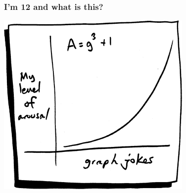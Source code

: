 \documentclass{beamer}
\begin{document}
\begin{frame}
  \begin{center}
    \frametitle{I'm 12 and what is this?}
    \includegraphics[height = 0.8\textheight, keepaspectration = true]{figure/graph_smbc}
  \end{center}
\end{frame}
\end{document}
